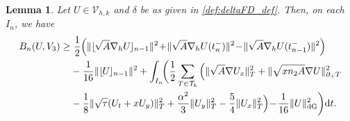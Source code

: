\documentclass{amsart}
\newcommand{\norm}[2]{\|{#1}\|_{{#2}}}
\newcommand{\ud}{\,{\rm d}}
\newcommand{\tjump}[1]{\lfloor\kern-0.4mm{#1}\kern-0.4mm\rfloor}
\newcommand{\Th}{\mathcal{T}_h}
\newcommand{\normal}{{n}}
\newtheorem{lemma}[theorem]{Lemma}
\theoremstyle{definition}
\theoremstyle{remark}
\numberwithin{equation}{section}
\begin{document}
\begin{lemma} \label{eq:hypo_st}
    Let $U \in  {\mathcal{V}}_{h,k}$ and $\delta$ be as given in \eqref{def:deltaFD_def}. Then, on each $I_n$, we have
    \begin{equation*}
        \begin{split}
            B_n(U,V_3)\ge &\
            \frac{1}{2}\Big( \norm{\tjump{\sqrt{A}\nabla_h U}_{n-1}}{}^2
            \!+\!	\norm{\sqrt{A}\nabla_h U(t_n^-)}{}^2 \! -\!	\norm{\sqrt{A}\nabla_h U(t_{n-1}^-)}{}^2   \Big)\\
            &	- \frac{1}{16} \norm{\tjump{U}_{n-1}}{}^2 +\int_{I_n}\!\! \bigg(\frac{1}{2}
                \sum_{T \in \Th} \Big(
             \norm{\sqrt{A}\nabla U_x}{T}^2
            +
               \norm{ \sqrt{x\normal_2 A}\nabla U }{\partial_+ T}^2
                \\
              &
             -
            \frac{1}{8} \norm{ \sqrt{\tau}(U_t + xU_y) }{T}^2
                +
                \frac{\alpha^2}{3} \norm{U_y}{T}^2
            -
                \frac{5}{4} \norm{U_x}{T}^2
            \Big)
            \!-\!
            \frac{1}{16}  \|U\|_{\rm dG}^2 \bigg)\!\ud t .
        \end{split}\end{equation*}
\end{lemma}
\end{document}
